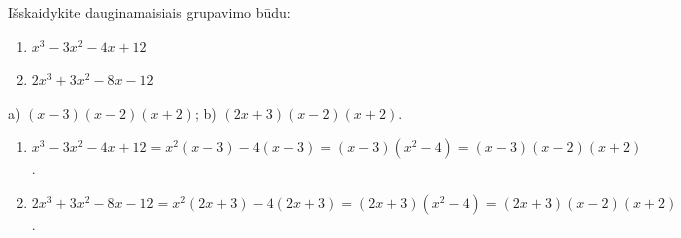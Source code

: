 \begin{salyga}
Išskaidykite dauginamaisiais grupavimo būdu:
    \begin{enumerate}[label=\alph*), itemsep=4pt]
        \item $x^3 - 3x^2 - 4x + 12$
        \item $2x^3 + 3x^2 - 8x - 12$
    \end{enumerate}
\end{salyga}

\begin{atsakymas}
a) $(x-3)(x-2)(x+2)$; b) $(2x+3)(x-2)(x+2)$.
\end{atsakymas}

\begin{sprendimas}
\begin{enumerate}[label=\alph*)]
\item $x^3-3x^2-4x+12=x^2(x-3)-4(x-3)=(x-3)(x^2-4)=(x-3)(x-2)(x+2)$.
\item $2x^3+3x^2-8x-12=x^2(2x+3)-4(2x+3)=(2x+3)(x^2-4)=(2x+3)(x-2)(x+2)$.
\end{enumerate}
\end{sprendimas}
